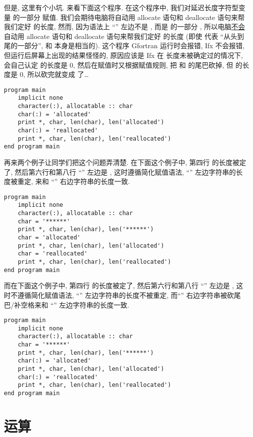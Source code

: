 但是, 这里有个小坑. 来看下面这个程序. 在这个程序中, 我们对延迟长度字符型变量  的一部分  赋值. 我们会期待电脑将自动用 allocate 语句和 deallocate 语句来帮我们定好  的长度, 然而, 因为语法上 ``\ttt{=}'' 左边不是 , 而是  的一部分 , 所以电脑\uline{不会}自动用 allocate 语句和 deallocate 语句来帮我们定好  的长度 (即使  代表  ``从头到尾的一部分'', 和  本身是相当的). 这个程序 Gfortran 运行时会报错, Ifx 不会报错, 但运行后屏幕上出现的结果怪怪的, 原因应该是 Ifx 在  长度未被确定过的情况下, 会自己认定  的长度是 $0$, 然后在赋值时又根据赋值规则, 把  和  的尾巴砍掉, 但  的长度是 $0$, 所以砍完就变成  了\dots{}
\begin{lstlisting}
program main
    implicit none
    character(:), allocatable :: char
    char(:) = 'allocated'
    print *, char, len(char), len('allocated')
    char(:) = 'reallocated'
    print *, char, len(char), len('reallocated')
end program main
\end{lstlisting}
再来两个例子让同学们把这个问题弄清楚. 在下面这个例子中, 第四行  的长度被定了, 然后第六行和第八行 ``\ttt{=}'' 左边是 , 这时遵循简化赋值语法, ``\ttt{=}'' 左边字符串的长度被重定, 来和 ``\ttt{=}'' 右边字符串的长度一致.
\begin{lstlisting}
program main
    implicit none
    character(:), allocatable :: char
    char = '******'
    print *, char, len(char), len('******')
    char = 'allocated'
    print *, char, len(char), len('allocated')
    char = 'reallocated'
    print *, char, len(char), len('reallocated')
end program main
\end{lstlisting}
而在下面这个例子中, 第四行  的长度被定了, 然后第六行和第八行 ``\ttt{=}'' 左边是 , 这时不遵循简化赋值语法, ``\ttt{=}'' 左边字符串的长度不被重定, 而``\ttt{=}'' 右边字符串被砍尾巴/补空格来和 ``\ttt{=}'' 左边字符串的长度一致.
\begin{lstlisting}
program main
    implicit none
    character(:), allocatable :: char
    char = '******'
    print *, char, len(char), len('******')
    char(:) = 'allocated'
    print *, char, len(char), len('allocated')
    char(:) = 'reallocated'
    print *, char, len(char), len('reallocated')
end program main
\end{lstlisting}

\section{运算}\label{fortran_opration}

